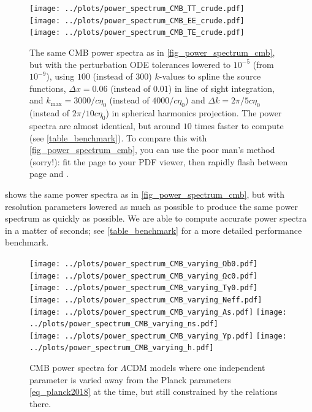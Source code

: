 \documentclass[10pt,a4paper]{article}
\begin{document}
\begin{figure}
\centering
\texttt{[image: ../plots/power\_spectrum\_CMB\_TT\_crude.pdf]} \\
\texttt{[image: ../plots/power\_spectrum\_CMB\_EE\_crude.pdf]} \\
\texttt{[image: ../plots/power\_spectrum\_CMB\_TE\_crude.pdf]}
\caption{
	The same CMB power spectra as in \cref{fig_power_spectrum_cmb},
	but with the perturbation ODE tolerances lowered to $10^{-5}$ (from $10^{-9}$),
	using $100$ (instead of $300$) $k$-values to spline the source functions,
	$\Delta x = 0.06$ (instead of $0.01$) in line of sight integration,
	and $k_\text{max}=3000/c\eta_0$ (instead of $4000/c\eta_0$) and $\Delta k = 2 \pi / 5 c \eta_0$ (instead of $2 \pi / 10 c \eta_0$) in spherical harmonics projection.
	The power spectra are almost identical, but around $10$ times faster to compute (see \cref{table_benchmark}).
	To compare this with \cref{fig_power_spectrum_cmb}, you can use the poor man's method (sorry!):
	fit the page to your PDF viewer, then rapidly flash between page \pageref{fig_power_spectrum_cmb} and \pageref{fig_power_spectrum_cmb_crude}.
}
\label{fig_power_spectrum_cmb_crude}
\end{figure}

 shows the same power spectra as in \cref{fig_power_spectrum_cmb},
but with resolution parameters lowered as much as possible to produce the same power spectrum as quickly as possible.
We are able to compute accurate power spectra in a matter of seconds; see \cref{table_benchmark} for a more detailed performance benchmark.

\begin{figure}
\centering
\texttt{[image: ../plots/power\_spectrum\_CMB\_varying\_Ωb0.pdf]} \hfill
\texttt{[image: ../plots/power\_spectrum\_CMB\_varying\_Ωc0.pdf]} \\
\texttt{[image: ../plots/power\_spectrum\_CMB\_varying\_Tγ0.pdf]} \hfill
\texttt{[image: ../plots/power\_spectrum\_CMB\_varying\_Neff.pdf]} \\
\texttt{[image: ../plots/power\_spectrum\_CMB\_varying\_As.pdf]} \hfill
\texttt{[image: ../plots/power\_spectrum\_CMB\_varying\_ns.pdf]} \\
\texttt{[image: ../plots/power\_spectrum\_CMB\_varying\_Yp.pdf]} \hfill
\texttt{[image: ../plots/power\_spectrum\_CMB\_varying\_h.pdf]} \\
\caption{CMB power spectra for $\Lambda$CDM models where one independent parameter is varied away from the Planck parameters \eqref{eq_planck2018} at the time, but still constrained by the relations there.}
\label{fig_power_spectrum_cmb_varying_parameters}
\end{figure}
\end{document}
